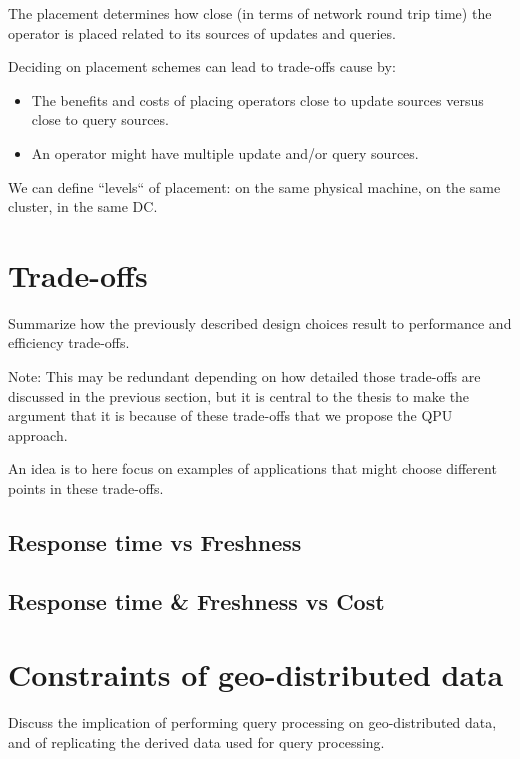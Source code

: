 The placement determines how close (in terms of network round trip time) the
operator is placed related to its sources of updates and queries.

Deciding on placement schemes can lead to trade-offs cause by:
\begin{itemize}
  \item The benefits and costs of placing operators close to update sources
  versus close to query sources.
  \item An operator might have multiple update and/or query sources.
\end{itemize}

We can define ``levels`` of placement: on the same physical machine, on the same
cluster, in the same DC.

\section{Trade-offs}
Summarize how the previously described design choices result to performance and
efficiency trade-offs.

Note: This may be redundant depending on how detailed those trade-offs are
discussed in the previous section, but it is central to the thesis to make the
argument that it is because of these trade-offs that we propose the QPU
approach.

An idea is to here focus on examples of applications that might choose different
points in these trade-offs.

\subsection{Response time vs Freshness}

\subsection{Response time \& Freshness vs Cost}


\section{Constraints of geo-distributed data}
Discuss the implication of performing query processing on geo-distributed data,
and of replicating the derived data used for query processing.

